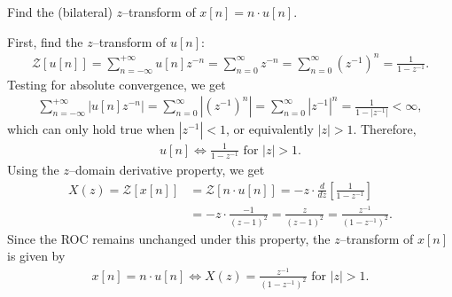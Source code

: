\documentclass{report}
\begin{document}
\begin{example}
    Find the (bilateral) $z$--transform of $x[n]=n\cdot u[n]$. 
\end{example}
\begin{solution}
    First, find the $z$--transform of $u[n]$:
    \begin{align*}
        \mathcal{Z}[u[n]] = \sum_{n=-\infty}^{+\infty} u[n] z^{-n} = \sum_{n=0}^{\infty} z^{-n} = \sum_{n=0}^{\infty} (z^{-1})^n = \frac{1}{1-z^{-1}}.
    \end{align*}
    Testing for absolute convergence, we get 
    \begin{align*}
        \sum_{n=-\infty}^{+\infty} \left|u[n] z^{-n}\right| = \sum_{n=0}^{\infty} \left|(z^{-1})^n\right| = \sum_{n=0}^{\infty} \left|z^{-1}\right|^n = \frac{1}{1-\left|z^{-1}\right|} < \infty,
    \end{align*}
    which can only hold true when $|z^{-1}| < 1$, or equivalently $|z| > 1$. Therefore,
    \begin{align*}
        u[n] \iff \frac{1}{1-z^{-1}} \text{ for } |z| > 1.
    \end{align*}
    Using the $z$--domain derivative property, we get 
    \begin{align*}
        X(z) = \mathcal{Z}[x[n]] &= \mathcal{Z}[n\cdot u[n]] = -z\cdot \frac{d}{dz}\left[\frac{1}{1-z^{-1}}\right] \\
        &= -z\cdot \frac{-1}{(z-1)^2} = \frac{z}{(z-1)^2} = \frac{z^{-1}}{(1-z^{-1})^2}.
    \end{align*}
    Since the ROC remains unchanged under this property, the $z$--transform of $x[n]$ is given by
    \begin{align*}
        x[n] = n\cdot u[n] \iff X(z) = \frac{z^{-1}}{(1-z^{-1})^2} \text{ for } |z| > 1.
    \end{align*}
\end{solution}
\end{document}
